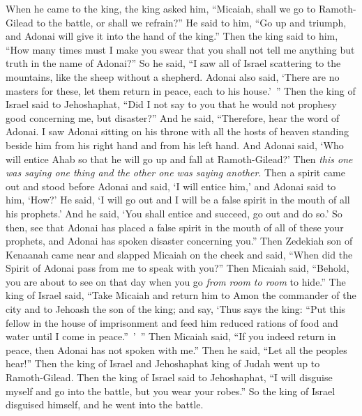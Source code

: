 \begin{biblechapter}
\verse When he came to the king, the king asked him, “Micaiah, shall we go to Ramoth-Gilead to the battle, or shall we refrain?” He said to him, “Go up and triumph, and Adonai will give it into the hand of the king.”
\verse Then the king said to him, “How many times must I make you swear that you shall not tell me anything but truth in the name of Adonai?”
\verse So he said, “I saw all of Israel scattering to the mountains, like the sheep without a shepherd. Adonai also said, ‘There are no masters for these, let them return in peace, each to his house.’ ”
\verse Then the king of Israel said to Jehoshaphat, “Did I not say to you that he would not prophesy good concerning me, but disaster?”
\verse And he said, “Therefore, hear the word of Adonai. I saw Adonai sitting on his throne with all the hosts of heaven standing beside him from his right hand and from his left hand.
\verse And Adonai said, ‘Who will entice Ahab so that he will go up and fall at Ramoth-Gilead?’ Then \textit{this one was saying one thing and the other one was saying another}.
\verse Then a spirit came out and stood before Adonai and said, ‘I will entice him,’ and Adonai said to him, ‘How?’
\verse He said, ‘I will go out and I will be a false spirit in the mouth of all his prophets.’ And he said, ‘You shall entice and succeed, go out and do so.’
\verse So then, see that Adonai has placed a false spirit in the mouth of all of these your prophets, and Adonai has spoken disaster concerning you.”
\verse Then Zedekiah son of Kenaanah came near and slapped Micaiah on the cheek and said, “When did the Spirit of Adonai pass from me to speak with you?”
\verse Then Micaiah said, “Behold, you are about to see on that day when you go \textit{from room to room} to hide.”
\verse The king of Israel said, “Take Micaiah and return him to Amon the commander of the city and to Jehoash the son of the king;
\verse and say, ‘Thus says the king: “Put this fellow in the house of imprisonment and feed him reduced rations of food and water until I come in peace.” ’ ”
\verse Then Micaiah said, “If you indeed return in peace, then Adonai has not spoken with me.” Then he said, “Let all the peoples hear!”
\verse Then the king of Israel and Jehoshaphat king of Judah went up to Ramoth-Gilead.
\verse Then the king of Israel said to Jehoshaphat, “I will disguise myself and go into the battle, but you wear your robes.” So the king of Israel disguised himself, and he went into the battle.

\end{biblechapter}
